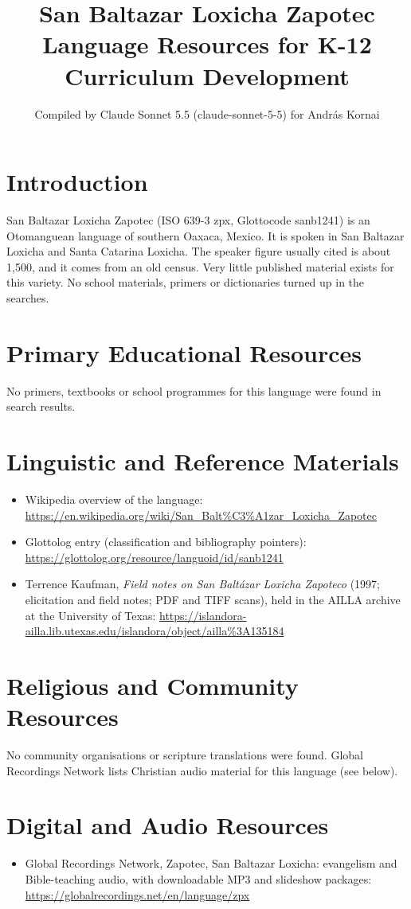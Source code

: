 \documentclass[12pt]{article}
\title{San Baltazar Loxicha Zapotec Language Resources for K-12 Curriculum Development}
\author{Compiled by Claude Sonnet 5.5 (claude-sonnet-5-5) for Andr\'as Kornai}
\date{}
\begin{document}
\maketitle

\section{Introduction}
San Baltazar Loxicha Zapotec (ISO 639-3 zpx, Glottocode sanb1241) is an Otomanguean language of southern Oaxaca, Mexico. It is spoken in San Baltazar Loxicha and Santa Catarina Loxicha. The speaker figure usually cited is about 1,500, and it comes from an old census. Very little published material exists for this variety. No school materials, primers or dictionaries turned up in the searches.

\section{Primary Educational Resources}
No primers, textbooks or school programmes for this language were found in search results.

\section{Linguistic and Reference Materials}
\begin{itemize}
\item Wikipedia overview of the language: \url{https://en.wikipedia.org/wiki/San_Balt%C3%A1zar_Loxicha_Zapotec}
\item Glottolog entry (classification and bibliography pointers): \url{https://glottolog.org/resource/languoid/id/sanb1241}
\item Terrence Kaufman, \emph{Field notes on San Balt\'azar Loxicha Zapoteco} (1997; elicitation and field notes; PDF and TIFF scans), held in the AILLA archive at the University of Texas: \url{https://islandora-ailla.lib.utexas.edu/islandora/object/ailla%3A135184}
\end{itemize}

\section{Religious and Community Resources}
No community organisations or scripture translations were found. Global Recordings Network lists Christian audio material for this language (see below).

\section{Digital and Audio Resources}
\begin{itemize}
\item Global Recordings Network, Zapotec, San Baltazar Loxicha: evangelism and Bible-teaching audio, with downloadable MP3 and slideshow packages: \url{https://globalrecordings.net/en/language/zpx}
\end{itemize}
\end{document}
